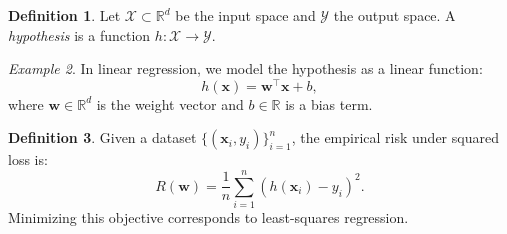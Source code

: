 \documentclass[11pt]{article}
\newcommand{\R}{\mathbb{R}}
\newcommand{\Xcal}{\mathcal{X}}  %
\newcommand{\Ycal}{\mathcal{Y}}  %
\newcommand{\vect}[1]{\bm{#1}}
\theoremstyle{definition}
\newtheorem{definition}{Definition}[section]
\theoremstyle{plain}
\theoremstyle{remark}
\newtheorem{example}[definition]{Example}
\begin{document}
\begin{definition}
    Let \( \Xcal \subset \R^d \) be the input space and \( \Ycal \) the output space. A \emph{hypothesis} is a
    function \( h: \Xcal \to \Ycal \).
\end{definition}

\begin{example}
    In linear regression, we model the hypothesis as a linear function:
    \[
        h(\vect{x}) = \vect{w}^\top \vect{x} + b,
    \]
    where \( \vect{w} \in \R^d \) is the weight vector and \( b \in \R \) is a bias term.
\end{example}

\begin{definition}
    Given a dataset \( \{(\vect{x}_i, y_i)\}_{i=1}^n \), the empirical risk under squared loss is:
    \[
        R(\vect{w}) = \frac{1}{n} \sum_{i=1}^n \left( h(\vect{x}_i) - y_i \right)^2.
    \]
    Minimizing this objective corresponds to least-squares regression.
\end{definition}
\end{document}

